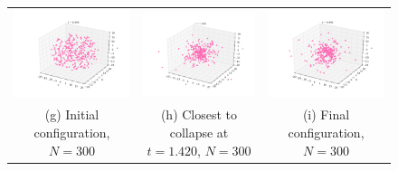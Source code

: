 \documentclass{article}
\begin{document}
\begin{multicols}{2}
\begin{figure}
\begin{center}
\begin{tabular}{ccc}
	\includegraphics[width=60mm]{Images/Image_300_0000.png}
	& \includegraphics[width=60mm]{Images/Image_300_1420.png}
	& \includegraphics[width=60mm]{Images/Image_300_4995.png} \\
	(g) Initial configuration, $N = 300$					& (h) Closest to collapse at $t = 1.420$, $N = 300$	 	& (i) Final configuration, $N = 300$	 \\[6pt]
	

\end{tabular}
\end{center}
\end{figure}
\end{multicols}
\end{document}
